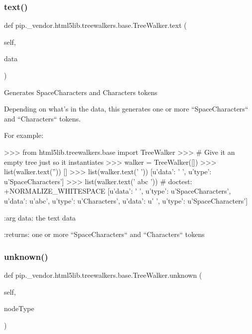 \subsubsection{\texorpdfstring{text()}{text()}}
{\footnotesize\ttfamily def pip.\+\_\+vendor.\+html5lib.\+treewalkers.\+base.\+Tree\+Walker.\+text (\begin{DoxyParamCaption}\item[{}]{self,  }\item[{}]{data }\end{DoxyParamCaption})}

\begin{DoxyVerb}Generates SpaceCharacters and Characters tokens

Depending on what's in the data, this generates one or more
``SpaceCharacters`` and ``Characters`` tokens.

For example:

    >>> from html5lib.treewalkers.base import TreeWalker
    >>> # Give it an empty tree just so it instantiates
    >>> walker = TreeWalker([])
    >>> list(walker.text(''))
    []
    >>> list(walker.text('  '))
    [{u'data': '  ', u'type': u'SpaceCharacters'}]
    >>> list(walker.text(' abc '))  # doctest: +NORMALIZE_WHITESPACE
    [{u'data': ' ', u'type': u'SpaceCharacters'},
    {u'data': u'abc', u'type': u'Characters'},
    {u'data': u' ', u'type': u'SpaceCharacters'}]

:arg data: the text data

:returns: one or more ``SpaceCharacters`` and ``Characters`` tokens\end{DoxyVerb}
 \mbox{\label{classpip_1_1__vendor_1_1html5lib_1_1treewalkers_1_1base_1_1TreeWalker_a460c48a4ce52afe6ed79fbf334307249}} 
\subsubsection{\texorpdfstring{unknown()}{unknown()}}
{\footnotesize\ttfamily def pip.\+\_\+vendor.\+html5lib.\+treewalkers.\+base.\+Tree\+Walker.\+unknown (\begin{DoxyParamCaption}\item[{}]{self,  }\item[{}]{node\+Type }\end{DoxyParamCaption})}

